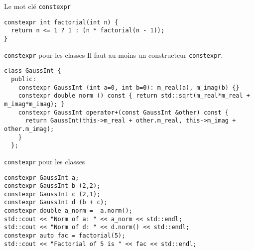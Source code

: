 \begin{frame}[fragile]{Le mot clé \texttt{constexpr}}
  \begin{lstlisting}
constexpr int factorial(int n) {
  return n <= 1 ? 1 : (n * factorial(n - 1));
}
  \end{lstlisting}
\end{frame}

\begin{frame}[fragile]{\texttt{constexpr} pour les classes}
  Il faut au moins un constructeur \texttt{constexpr}.

  \begin{lstlisting}
class GaussInt {
  public:
    constexpr GaussInt (int a=0, int b=0): m_real(a), m_imag(b) {}
    constexpr double norm () const { return std::sqrt(m_real*m_real + m_imag*m_imag); }
    constexpr GaussInt operator+(const GaussInt &other) const {
      return GaussInt(this->m_real + other.m_real, this->m_imag + other.m_imag);
    }
  };
  \end{lstlisting}
\end{frame}

\begin{frame}[fragile]{\texttt{constexpr} pour les classes}
  \begin{lstlisting}
constexpr GaussInt a;
constexpr GaussInt b (2,2);
constexpr GaussInt c (2,1);
constexpr GaussInt d (b + c);
constexpr double a_norm =  a.norm();
std::cout << "Norm of a: " << a_norm << std::endl;
std::cout << "Norm of d: " << d.norm() << std::endl;
constexpr auto fac = factorial(5);
std::cout << "Factorial of 5 is " << fac << std::endl;
  \end{lstlisting}
\end{frame}
